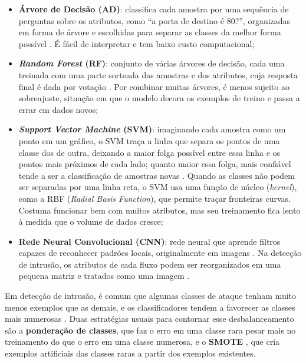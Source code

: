 \documentclass[alpha-refs,brazilian]{CC-EC_TF-TC}
\begin{document}
\begin{itemize}
    \item \textbf{Árvore de Decisão (AD)}: classifica cada amostra por uma sequência de perguntas sobre os atributos, como ``a porta de destino é 80?'', organizadas em forma de árvore e escolhidas para separar as classes da melhor forma possível \citep{breiman1984cart}. É fácil de interpretar e tem baixo custo computacional;
    \item \textbf{\textit{Random Forest} (RF)}: conjunto de várias árvores de decisão, cada uma treinada com uma parte sorteada das amostras e dos atributos, cuja resposta final é dada por votação \citep{breiman2001random}. Por combinar muitas árvores, é menos sujeito ao sobreajuste, situação em que o modelo decora os exemplos de treino e passa a errar em dados novos;
    \item \textbf{\textit{Support Vector Machine} (SVM)}: imaginando cada amostra como um ponto em um gráfico, o SVM traça a linha que separa os pontos de uma classe dos de outra, deixando a maior folga possível entre essa linha e os pontos mais próximos de cada lado; quanto maior essa folga, mais confiável tende a ser a classificação de amostras novas \citep{cortes1995support}. Quando as classes não podem ser separadas por uma linha reta, o SVM usa uma função de núcleo (\textit{kernel}), como a RBF (\textit{Radial Basis Function}), que permite traçar fronteiras curvas. Costuma funcionar bem com muitos atributos, mas seu treinamento fica lento à medida que o volume de dados cresce;
    \item \textbf{Rede Neural Convolucional (CNN)}: rede neural que aprende filtros capazes de reconhecer padrões locais, originalmente em imagens \citep{lecun2015deep}. Na detecção de intrusão, os atributos de cada fluxo podem ser reorganizados em uma pequena matriz e tratados como uma imagem \citep{bochie2020deteccao}.
\end{itemize}

Em detecção de intrusão, é comum que algumas classes de ataque tenham muito menos exemplos que as demais, e os classificadores tendem a favorecer as classes mais numerosas \citep{chawla2002smote}. Duas estratégias usuais para contornar esse desbalanceamento são a \textbf{ponderação de classes}, que faz o erro em uma classe rara pesar mais no treinamento do que o erro em uma classe numerosa, e o \textbf{SMOTE} \citep{chawla2002smote}, que cria exemplos artificiais das classes raras a partir dos exemplos existentes.

\end{document}

